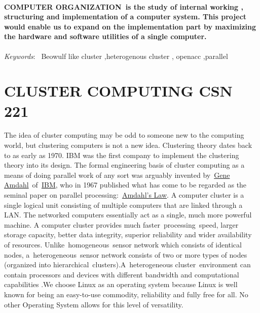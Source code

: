 \documentclass[a4paper]{article}
\newcommand\textstyleStrong[1]{\textmd{\MakeUppercase{#1}}}
\newcommand\textstyleEmphasis[1]{\textit{#1}}
\newcommand\textstyleInternetlink[1]{\textcolor[rgb]{0.0,0.0,0.5019608}{#1}}
\newcommand\textstylevmhook[1]{#1}
\newcommand\textstyletopichighlight[1]{#1}
\begin{document}
\paragraph[Computer Organization~is the study of internal working , structuring and implementation of a computer system.
This project would enable us to expand on the implementation part by maximizing the hardware and software utilities of
a single computer.]{\textstyleStrong{\textup{\textcolor[rgb]{0.14117648,0.16078432,0.18039216}{Computer
Organization}}}\textup{\textcolor[rgb]{0.14117648,0.16078432,0.18039216}{~}}\textmd{\textup{\textcolor[rgb]{0.14117648,0.16078432,0.18039216}{is
the study of internal working , structuring and implementation of a computer system. This project would enable us to
expand on the implementation part by maximizing the hardware and software utilities of a single computer.}}}}

\bigskip

\textstyleEmphasis{Keywords}: \ \textcolor[rgb]{0.14117648,0.16078432,0.18039216}{Beowulf like cluster ,}heterogenous
cluster , openacc ,parallel 

\section[CLUSTER COMPUTINGCSN 221]{CLUSTER COMPUTING\newline
CSN 221}

\bigskip

The idea of cluster computing may be odd to someone new to the computing world, but clustering computers is not a new
idea. Clustering theory dates back to as early as 1970. IBM was the first company to implement the clustering theory
into its design. The formal engineering basis of cluster computing as a means of doing parallel work of any sort was
arguably invented by~\href{https://en.wikipedia.org/wiki/Gene_Amdahl}{\textstyleInternetlink{Gene
Amdahl}}~of~\href{https://en.wikipedia.org/wiki/IBM}{\textstyleInternetlink{IBM}}, who in 1967 published what has come
to be regarded as the seminal paper on parallel
processing:~\href{https://en.wikipedia.org/wiki/Amdahl%27s_Law}{\textstyleInternetlink{Amdahl's Law}}. A computer cluster is a single logical unit consisting of multiple computers that are linked through a LAN. The networked computers essentially act as a single, much more powerful machine. A computer cluster provides much faster~\textstylevmhook{processing}~speed, larger storage capacity, better data integrity, superior reliability and wider availability of resources\textcolor[rgb]{0.2,0.2,0.2}{. }Unlike~homogeneous~sensor network which consists of identical nodes, a~heterogeneous~sensor network consists of two or more types of nodes (organized into hierarchical~clusters).A~\textstyletopichighlight{heterogeneous cluster}~environment can contain processors and devices with different bandwidth and computational capabilities .We choose Linux as an operating system because Linux is well known for being an easy-to-use commodity, reliability and fully free for all. No other Operating System allows for this level of versatility. 
\end{document}
